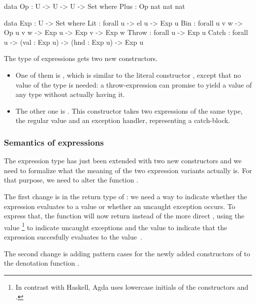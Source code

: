 \begin{code}
  data Op : U -> U -> U -> Set where
    Plus : Op nat nat nat
\end{code}

\begin{code}
  data Exp : U -> Set where
    Lit : forall {u} -> el u -> Exp u
    Bin : forall {u v w} -> Op u v w -> Exp u -> Exp v -> Exp w
    Throw : forall {u} -> Exp u
    Catch : forall {u} -> (val : Exp u) -> (hnd : Exp u) -> Exp u
\end{code}

\noindent The type of expressions gets two new constructors.
\begin{itemize}

  \item One of them is , which is similar to the literal
    constructor , except that no value of the type  is
    needed: a throw-expression can promise to yield a value of any type without
    actually having it.

  \item The other one is . This constructor takes two expressions of
    the same type, the regular value and an exception handler, representing a
    catch-block.

\end{itemize}

\subsubsection{Semantics of expressions}

The expression type has just been extended with two new constructors and we
need to formalize what the meaning of the two expression variants actually is.
For that purpose, we need to alter the function .

The first change is in the return type of : we need a way to
indicate whether the expression evaluates to a value or whether an uncaught
exception occurs. To express that, the function  will now return
 instead of the more direct , using the value
\footnote{In contrast with Haskell, Agda uses lowercase initials
of the constructors  and .} to indicate uncaught
exceptions and the value  to indicate that the expression
succesfully evaluates to the value~.

The second change is adding pattern cases for the newly added constructors
of  to the denotation function .

